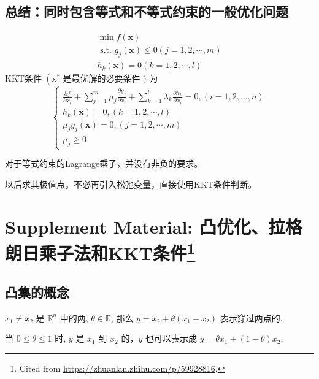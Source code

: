 \subsection{总结：同时包含等式和不等式约束的一般优化问题}

\begin{theorem}[同时包含等式和不等式约束的一般优化问题的KKT条件]
    $$
\begin{array}{l}
\min f(\mathbf{x}) \\
\text { s.t. } g_{j}(\mathbf{x}) \leq 0(j=1,2, \cdots, m) \\
h_{k}(\mathbf{x})=0(k=1,2, \cdots, l)
\end{array}
$$
KKT条件 $ \left(\mathrm{x}^{*}\right. $ 是最优解的必要条件 $ ) $ 为
$$
\left\{\begin{array}{l}
\frac{\partial f}{\partial x_{i}}+\sum_{j=1}^{m} \mu_{j} \frac{\partial g_{j}}{\partial x_{i}}+\sum_{k=1}^{l} \lambda_{k} \frac{\partial h_{k}}{\partial x_{i}}=0,(i=1,2, \ldots, n) \\
h_{k}(\mathbf{x})=0,(k=1,2, \cdots, l) \\
\mu_{j} g_{j}(\mathbf{x})=0,(j=1,2, \cdots, m) \\
\mu_{j} \geq 0
\end{array}\right.
$$
\end{theorem}

\begin{remark}
    对于等式约束的Lagrange乘子，并没有非负的要求。
\end{remark}

\begin{remark}
    以后求其极值点，不必再引入松弛变量，直接使用KKT条件判断。
\end{remark}


\section[Supplement Material: 凸优化、拉格朗日乘子法和KKT条件]{Supplement Material: 凸优化、拉格朗日乘子法和KKT条件\footnote{Cited from \url{https://zhuanlan.zhihu.com/p/59928816}.}}

\subsection{凸集的概念}

\begin{definition}[点、（直）线、线段]
    $ x_{1} \neq x_{2} $ 是 $ \mathbb{R}^{n} $ 中的两, $ \theta \in \mathbb{R} $, 那么 $ y=x_{2}+\theta\left(x_{1}-x_{2}\right) $ 表示穿过两点的.

    当 $ 0 \leqslant \theta \leqslant 1 $ 时, $ y $ 是 $ x_{1} $ 到 $ x_{2} $ 的，$ y $ 也可以表示成 $ y=\theta x_{1}+(1-\theta) x_{2} $.
\end{definition}

